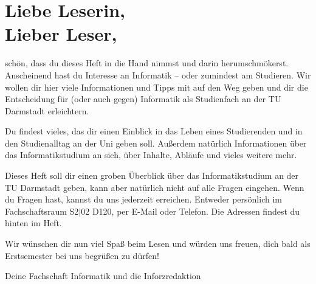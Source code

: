\section*{Liebe Leserin,\\ Lieber Leser,}

\vspace{1cm}
schön, dass du dieses Heft in die Hand nimmst und darin herumschmökerst. Anscheinend hast du Interesse an Informatik – oder zumindest am Studieren. Wir wollen dir hier viele Informationen und Tipps mit auf den Weg geben und dir die Entscheidung für (oder auch gegen) Informatik als Studienfach an der TU Darmstadt erleichtern.

\vspace{0.5cm}
Du findest vieles, das dir einen Einblick in das Leben eines Studierenden und in den Studienalltag an der Uni geben soll. Außerdem natürlich Informationen über das Informatikstudium an sich, über Inhalte, Abläufe und vieles weitere mehr.

\vspace{0.5cm}
Dieses Heft soll dir einen groben Überblick über das Informatikstudium an der TU Darmstadt geben, kann aber natürlich nicht auf alle Fragen eingehen. Wenn du Fragen hast, kannst du uns jederzeit erreichen. Entweder persönlich im Fachschaftsraum S2$|$02 D120, per E-Mail oder Telefon. Die Adressen findest du hinten im Heft.

\vspace{0.5cm}
Wir wünschen dir nun viel Spaß beim Lesen und würden uns freuen, dich bald als Erstsemester bei uns begrüßen zu dürfen!

\vspace{1cm}
Deine Fachschaft Informatik und die Inforzredaktion


\vfill



\newpage
